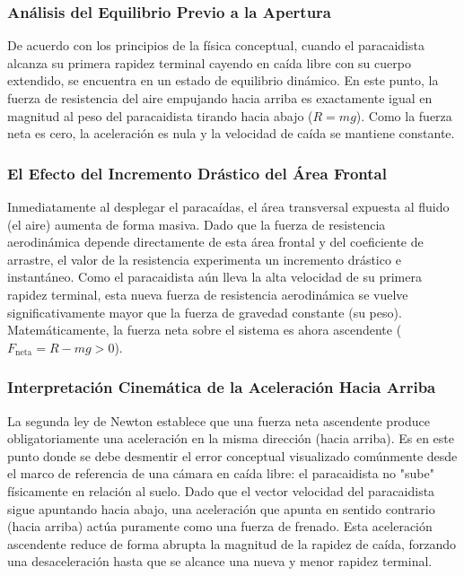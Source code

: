 \documentclass[12pt]{article}
\begin{document}
\subsubsection*{Análisis del Equilibrio Previo a la Apertura}
De acuerdo con los principios de la física conceptual, cuando el paracaidista alcanza su primera rapidez terminal cayendo en caída libre con su cuerpo extendido, se encuentra en un estado de equilibrio dinámico. En este punto, la fuerza de resistencia del aire empujando hacia arriba es exactamente igual en magnitud al peso del paracaidista tirando hacia abajo ($R = mg$). Como la fuerza neta es cero, la aceleración es nula y la velocidad de caída se mantiene constante.

\subsubsection*{El Efecto del Incremento Drástico del Área Frontal}
Inmediatamente al desplegar el paracaídas, el área transversal expuesta al fluido (el aire) aumenta de forma masiva. Dado que la fuerza de resistencia aerodinámica depende directamente de esta área frontal y del coeficiente de arrastre, el valor de la resistencia experimenta un incremento drástico e instantáneo. Como el paracaidista aún lleva la alta velocidad de su primera rapidez terminal, esta nueva fuerza de resistencia aerodinámica se vuelve significativamente mayor que la fuerza de gravedad constante (su peso). Matemáticamente, la fuerza neta sobre el sistema es ahora ascendente ($F_{\text{neta}} = R - mg > 0$).

\subsubsection*{Interpretación Cinemática de la Aceleración Hacia Arriba}
La segunda ley de Newton establece que una fuerza neta ascendente produce obligatoriamente una aceleración en la misma dirección (hacia arriba). Es en este punto donde se debe desmentir el error conceptual visualizado comúnmente desde el marco de referencia de una cámara en caída libre: el paracaidista no "sube" físicamente en relación al suelo. Dado que el vector velocidad del paracaidista sigue apuntando hacia abajo, una aceleración que apunta en sentido contrario (hacia arriba) actúa puramente como una fuerza de frenado. Esta aceleración ascendente reduce de forma abrupta la magnitud de la rapidez de caída, forzando una desaceleración hasta que se alcance una nueva y menor rapidez terminal.
\end{document}
